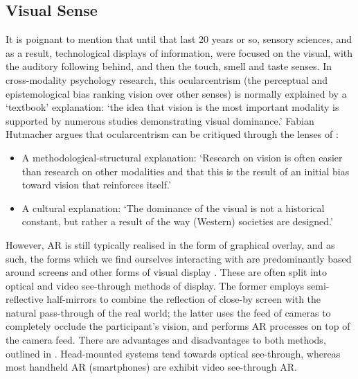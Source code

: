 \subsection{Visual Sense}\label{sec: ar-sensory-visual}
It is poignant to mention that until that last 20 years or so, sensory sciences, and as a result, technological displays of information, were focused on the visual, with the auditory following behind, and then the touch, smell and taste senses. In cross-modality psychology research, this ocularcentrism (the perceptual and epistemological bias ranking vision over other senses) is normally explained by a `textbook' explanation: `the idea that vision is the most important modality is supported by numerous studies demonstrating visual dominance.' Fabian Hutmacher argues that ocularcentrism can be critiqued through the lenses of \citeyearpar{hutmacher2019}: 

\begin{itemize}
    \item A methodological-structural explanation: `Research on vision is often easier than research on other modalities and that this is the result of an initial bias toward vision that reinforces itself.'
    \item A cultural explanation: `The dominance of the visual is not a historical constant, but rather a result of the way (Western) societies are designed.'
\end{itemize}

However, AR is still typically realised in the form of graphical overlay, and as such, the forms which we find ourselves interacting with are predominantly based around screens and other forms of visual display \citep{dey2018}. These are often split into optical and video see-through methods of display. The former employs semi-reflective half-mirrors to combine the reflection of close-by screen with the natural pass-through of the real world; the latter uses the feed of cameras to completely occlude the participant's vision, and performs AR processes on top of the camera feed. There are advantages and disadvantages to both methods, outlined in \citep{rolland2000}. Head-mounted systems tend towards optical see-through, whereas most handheld AR (smartphones) are exhibit video see-through AR.

